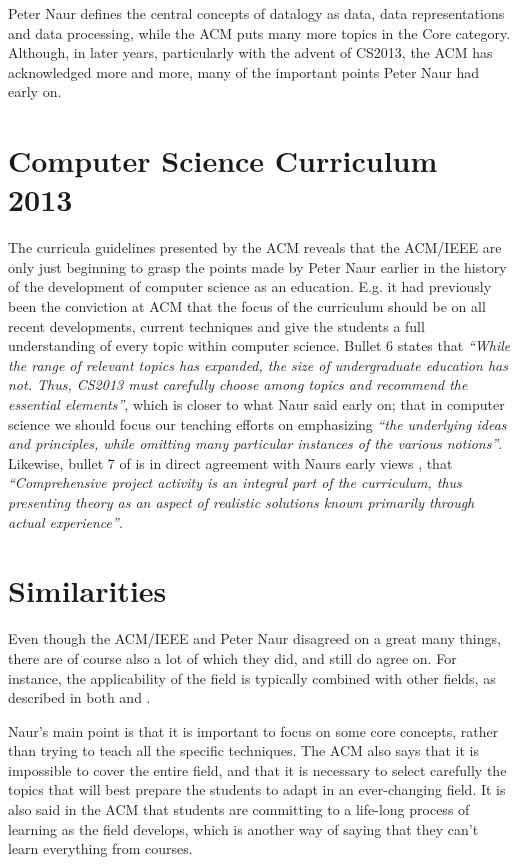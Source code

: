 \documentclass[11pt,a4paper]{article}
\begin{document}
Peter Naur defines the central concepts of datalogy as data, data representations and data processing, while the ACM
puts many more topics in the Core category. Although, in later years, particularly with the advent of CS2013, the ACM
has acknowledged more and more, many of the important points Peter Naur had early on.

\section{Computer Science Curriculum 2013}
The curricula guidelines presented \cite{acm13} by the ACM reveals that the ACM/IEEE are only just beginning to grasp the points
made by Peter Naur earlier in the history of the development of computer science as an education. E.g. it had previously
been the conviction at ACM that the focus of the curriculum should be on all recent developments, current techniques and
give the students a full understanding of every topic \cite{froekjaer88} within computer science. Bullet 6 states that \emph{``While the range
of relevant topics has expanded, the size of undergraduate education has not. Thus, CS2013 must carefully choose among
topics and recommend the essential elements''}, which is closer to what Naur said \cite{froekjaer88} early on; that in computer science
we should focus our teaching efforts on emphasizing \emph{``the underlying ideas and principles, while omitting many particular
instances of the various notions''}. Likewise, bullet 7 of \cite{acm13} is in direct agreement with Naurs early views \cite{froekjaer88}, that
\emph{``Comprehensive project activity is an integral part of the curriculum, thus presenting theory as an aspect of realistic
solutions known primarily through actual experience''}.

\section{Similarities}
Even though the ACM/IEEE and Peter Naur disagreed on a great many things, there are of course also a lot of which they
did, and still do agree on. For instance, the applicability of the field is typically combined with other fields, as
described in both \cite{froekjaer88} and \cite{acm13}.

Naur’s main point is that it is important to focus on some core concepts, rather than trying to teach all the specific
techniques. The ACM also says that it is impossible to cover the entire field, and that it is necessary to select
carefully the topics that will best prepare the students to adapt in an ever-changing field. It is also said in the ACM
that students are committing to a life-long process of learning as the field develops, which is another way of saying
that they can’t learn everything from courses.
\end{document}
